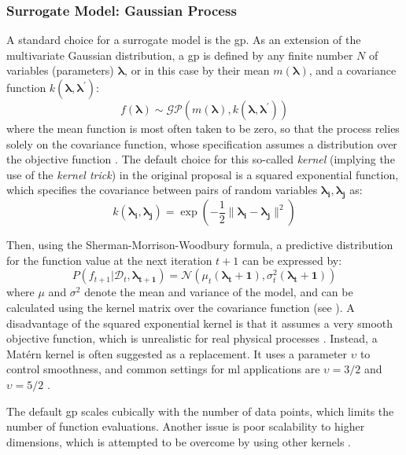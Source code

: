 \subsubsection{Surrogate Model: Gaussian Process}
A standard choice for a surrogate model is the \gls{gp}. As an extension of the multivariate Gaussian distribution, a \gls{gp} is defined by any finite number $N$ of variables (parameters) $\mathbf{\lambda}$, or in this case by their mean $m(\mathbf{\lambda})$, and a covariance function $k(\mathbf{\lambda},\mathbf{\lambda}^{\prime})$:
\begin{equation}
	f(\mathbf{\lambda}) \sim \mathcal{GP}(m(\mathbf{\lambda}), k(\mathbf{\lambda},\mathbf{\lambda}^{\prime}))
\end{equation}
where the mean function is most often taken to be zero, so that the process relies solely on the covariance function, whose specification assumes a distribution over the objective function \cite{williams2006gaussian}. The default choice for this so-called \textit{kernel} (implying the use of the \textit{kernel trick}) in the original proposal is a squared exponential function, which specifies the covariance between pairs of random variables $\mathbf{\lambda_i},\mathbf{\lambda_j}$ as:
\begin{equation}
	k(\mathbf{\lambda_i},\mathbf{\lambda_j}) = \exp \left(  -\frac{1}{2} \lVert \mathbf{\lambda_i} - \mathbf{\lambda_j} \rVert^2 \right) 
\end{equation}

Then, using the Sherman-Morrison-Woodbury formula, a predictive distribution for the function value at the next iteration $t+1$ can be expressed by:
\begin{equation}
	P(f_{t+1} | \mathcal{D}_t, \mathbf{\lambda_{t+1}} ) = \mathcal{N}(\mu_t(\mathbf{\lambda_t+1}), \sigma^2_t(\mathbf{\lambda_t+1}))
\end{equation}
where $\mu$ and $\sigma^2$ denote the mean and variance of the model, and can be calculated using the kernel matrix over the covariance function (see \cite[p.8]{brochu2010tutorial}).
A disadvantage of the squared exponential kernel is that it assumes a very smooth objective function, which is unrealistic for real physical processes \cite{stein1999interpolation}.  
Instead, a Matérn kernel is often suggested as a replacement. It uses a parameter $\upsilon$ to control  smoothness, and common settings for \gls{ml} applications are $\upsilon = 3/2$ and $\upsilon=5/2$ \cite{williams2006gaussian}.

The default \gls{gp} scales cubically with the number of data points, which limits the number of function evaluations. Another issue is poor scalability to higher dimensions, which is attempted to be overcome by using other kernels \cite{feurer2019hyperparameter}.


